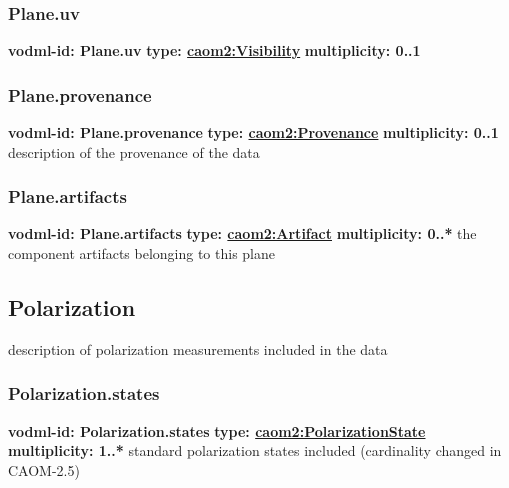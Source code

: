     \subsubsection{Plane.uv}
      \textbf{vodml-id: Plane.uv} \newline
      \textbf{type: \hyperref[sect:Visibility]{caom2:Visibility}} \newline
      \textbf{multiplicity: 0..1} 

    \subsubsection{Plane.provenance}
      \textbf{vodml-id: Plane.provenance} \newline
      \textbf{type: \hyperref[sect:Provenance]{caom2:Provenance}} \newline
      \textbf{multiplicity: 0..1} \newline
      description of the provenance of the data

    \subsubsection{Plane.artifacts}
      \textbf{vodml-id: Plane.artifacts} \newline
      \textbf{type: \hyperref[sect:Artifact]{caom2:Artifact}} \newline
      \textbf{multiplicity: 0..*} \newline
      the component artifacts belonging to this plane

  \subsection{Polarization}
  \label{sect:Polarization}
    description of polarization measurements included in the data

    \subsubsection{Polarization.states}
      \textbf{vodml-id: Polarization.states} \newline
      \textbf{type: \hyperref[sect:PolarizationState]{caom2:PolarizationState}} \newline
      \textbf{multiplicity: 1..*} \newline
      standard polarization states included (cardinality changed in CAOM-2.5)

